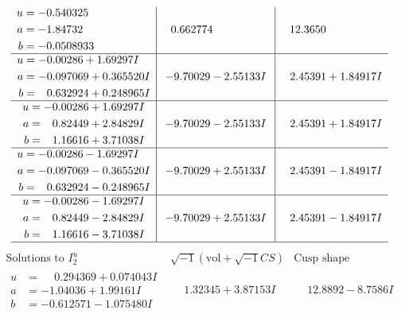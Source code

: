 \documentclass[1p]{elsarticle_modified}
\theoremstyle{definition}
\newcommand{\I}{\sqrt{-1}}
\begin{document}
$$\begin{array}{c|c|c}
\begin{aligned}
u &= -0.540325\phantom{ +0.000000I} \\
a &= -1.84732\phantom{ +0.000000I} \\
b &= -0.0508933\phantom{ +0.000000I}\end{aligned}
 & \phantom{-}0.662774\phantom{ +0.000000I} & \phantom{-}12.3650\phantom{ +0.000000I} \\ \hline\begin{aligned}
u &= -0.00286 + 1.69297 I \\
a &= -0.097069 + 0.365520 I \\
b &= \phantom{-}0.632924 + 0.248965 I\end{aligned}
 & -9.70029 - 2.55133 I & \phantom{-}2.45391 + 1.84917 I \\ \hline\begin{aligned}
u &= -0.00286 + 1.69297 I \\
a &= \phantom{-}0.82449 + 2.84829 I \\
b &= \phantom{-}1.16616 + 3.71038 I\end{aligned}
 & -9.70029 - 2.55133 I & \phantom{-}2.45391 + 1.84917 I \\ \hline\begin{aligned}
u &= -0.00286 - 1.69297 I \\
a &= -0.097069 - 0.365520 I \\
b &= \phantom{-}0.632924 - 0.248965 I\end{aligned}
 & -9.70029 + 2.55133 I & \phantom{-}2.45391 - 1.84917 I \\ \hline\begin{aligned}
u &= -0.00286 - 1.69297 I \\
a &= \phantom{-}0.82449 - 2.84829 I \\
b &= \phantom{-}1.16616 - 3.71038 I\end{aligned}
 & -9.70029 + 2.55133 I & \phantom{-}2.45391 - 1.84917 I\\
 \hline 
 \end{array}$$\newpage$$\begin{array}{c|c|c}  
\text{Solutions to }I^u_{2}& \I (\text{vol} + \sqrt{-1}CS) & \text{Cusp shape}\\
 \hline 
\begin{aligned}
u &= \phantom{-}0.294369 + 0.074043 I \\
a &= -1.04036 + 1.99161 I \\
b &= -0.612571 - 1.075480 I\end{aligned}
 & \phantom{-}1.32345 + 3.87153 I & \phantom{-}12.8892 - 8.7586 I \\ \hline\begin{aligned}

\end{aligned}
\end{array}$$
\end{document}
